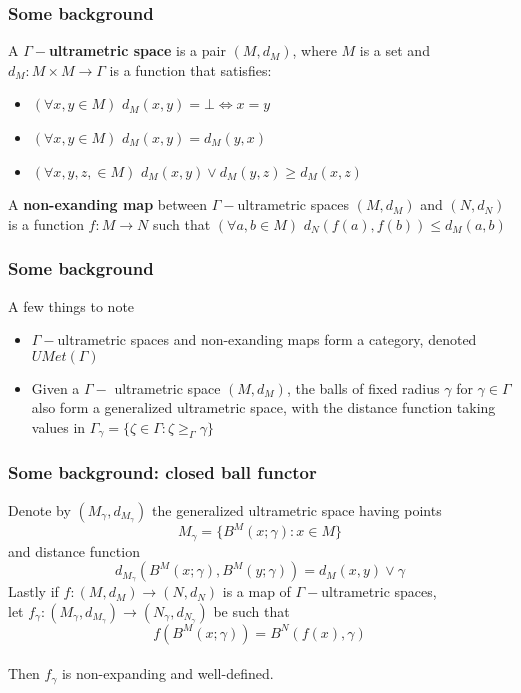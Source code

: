 \documentclass{beamer}
\begin{document}
\begin{frame}
\frametitle{Some background}

\begin{definition}
A \textbf{$\Gamma-$ultrametric space} is a pair $(M,d_M)$, where $M$ is a set and $d_M: M \times M \rightarrow \Gamma$ is a function that satisfies:
	\begin{itemize}
		\item $(\forall x,y \in M)$   $d_M(x,y) = \bot \iff x =y$
		\item $(\forall x,y \in M)$   $d_M(x,y) = d_M(y,x)$
		\item $(\forall x,y,z,\in M)$ $d_M(x,y) \vee d_M(y,z) \geq d_M(x,z)$
	\end{itemize}		
\end{definition}

\begin{definition}
A \textbf{non-exanding map} between $\Gamma-$ultrametric spaces $(M,d_M)$ and $(N,d_N)$ is a function $f: M \rightarrow N$ such that $(\forall a,b \in M)$ $d_N(f(a),f(b)) \leq d_M(a,b)$		
\end{definition}	
\end{frame}


\begin{frame}
	\frametitle{Some background}
A few things to note	
	\begin{itemize}
		\item $\Gamma-$ultrametric spaces and non-exanding maps form a category, denoted \textbf{$UMet(\Gamma)$}
		\item Given a $\Gamma-$ ultrametric space $(M,d_M)$, the balls of fixed radius $\gamma$ for $\gamma \in \Gamma$ also form a generalized ultrametric space,  with the distance function taking values in $\Gamma_\gamma = \{\zeta \in \Gamma : \zeta \geq_\Gamma \gamma\}$
	\end{itemize}
\end{frame}

\begin{frame}
	\frametitle{Some background: closed ball functor}
	Denote by \textbf{$(M_\gamma,d_{M_\gamma})$} the generalized ultrametric space having points
	\[M_\gamma = \{B^M(x; \gamma): x \in M\}\]
	and distance function
	\[d_{M_\gamma} (B^M(x;\gamma), B^M(y;\gamma)) = d_M(x,y) \vee \gamma\]
Lastly if $f:(M,d_M) \rightarrow (N,d_N)$ is a map of $\Gamma-$ultrametric spaces,\\ let $f_\gamma:(M_\gamma, d_{M_\gamma}) \rightarrow (N_\gamma, d_{N_\gamma})$ be such that \[f(B^M(x;\gamma)) = B^N(f(x), \gamma)\]\\ Then $f_\gamma$ is non-expanding and well-defined.\\

\end{frame}
\end{document}
